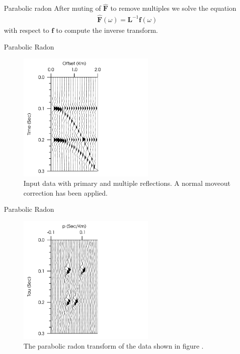 \documentclass[xcolor=dvipsnames,notes]{beamer}
\begin{document}
\begin{frame}{Parabolic radon}
After muting of $\hat{\mathbf{F}}$ to remove multiples we solve the equation
\begin{eqnarray}
  \hat{\mathbf{F}}(\omega) = \mathbf{L}^{-1}\mathbf{f}(\omega)
                   \label{eq:6-para-inv3}
\end{eqnarray}
with respect to $\mathbf{f}$ to compute the inverse transform.
\end{frame}
\begin{frame}{Parabolic Radon}
%
\begin{figure}
\includegraphics[width=0.6\textwidth]{Fig/fig-6-data.pdf} 
\caption{Input data with primary and multiple reflections. A normal moveout correction
         has been applied.} 
\label{fig-6-data}
\end{figure}
\end{frame}
%
\begin{frame}{Parabolic Radon}
\begin{figure}
\includegraphics[width=0.6\textwidth]{Fig/fig-6-radon.pdf} 
\caption{The parabolic radon transform of the data shown in figure \protect{\ref{fig-6-data}}.}
\end{figure}
\end{frame}
\end{document}
